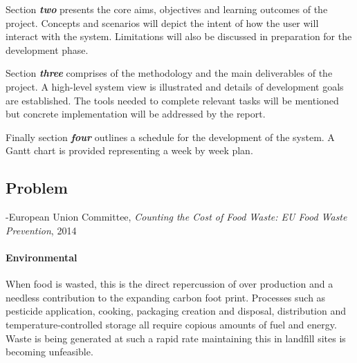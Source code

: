 \documentclass[a4paper, 11pt]{article}
\begin{document}
\vspace{\baselineskip}
Section \textbf{\emph{two}} presents the core aims, objectives and learning outcomes of the project. Concepts and scenarios will depict the intent of how the user will interact with the system. Limitations will also be discussed in preparation for the development phase.

\vspace{\baselineskip}
Section \textbf{\emph{three}}  comprises of the methodology and the main deliverables of the project. A high-level system view is illustrated and details of development goals are established. The tools needed to complete relevant tasks will be mentioned but concrete implementation will be addressed by the report. 
\vspace{\baselineskip}

Finally section \textbf{\emph{four}}  outlines a schedule for the development of the system. A Gantt chart is provided representing a week by week plan.

\vspace{\baselineskip}
\vspace{\baselineskip}
\vspace{\baselineskip}


\subsection{Problem}

\begin{quoting}
-European Union Committee, \emph{Counting the Cost of Food Waste: EU Food Waste Prevention}, 2014\cite{FoodWaste}
\end{quoting}

\paragraph{Environmental}When food is wasted, this is the direct repercussion of over production and a needless contribution to the expanding carbon foot print. Processes such as pesticide application, cooking, packaging creation and disposal, distribution and temperature-controlled storage all require copious amounts of fuel and energy. Waste is being generated at such a rapid rate maintaining this in landfill sites is becoming unfeasible.\cite{waste}
\end{document}
